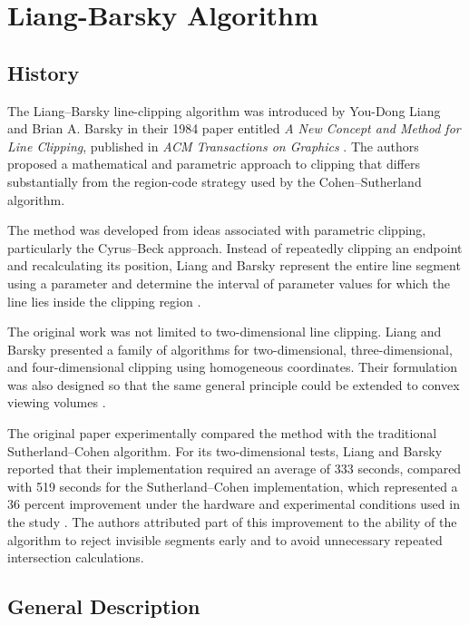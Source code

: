 
\section{Liang-Barsky Algorithm}

\subsection{History}

The Liang--Barsky line-clipping algorithm was introduced by You-Dong Liang and Brian A. Barsky in their 1984 paper entitled \textit{A New Concept and Method for Line Clipping}, published in \textit{ACM Transactions on Graphics} \cite{LiangBarsky1984}. The authors proposed a mathematical and parametric approach to clipping that differs substantially from the region-code strategy used by the Cohen--Sutherland algorithm.

The method was developed from ideas associated with parametric clipping, particularly the Cyrus--Beck approach. Instead of repeatedly clipping an endpoint and recalculating its position, Liang and Barsky represent the entire line segment using a parameter and determine the interval of parameter values for which the line lies inside the clipping region \cite{MatthesDrakopoulos2022}.

The original work was not limited to two-dimensional line clipping. Liang and Barsky presented a family of algorithms for two-dimensional, three-dimensional, and four-dimensional clipping using homogeneous coordinates. Their formulation was also designed so that the same general principle could be extended to convex viewing volumes \cite{LiangBarsky1984,GeneralizationLiangBarsky}.

The original paper experimentally compared the method with the traditional Sutherland--Cohen algorithm. For its two-dimensional tests, Liang and Barsky reported that their implementation required an average of 333 seconds, compared with 519 seconds for the Sutherland--Cohen implementation, which represented a 36 percent improvement under the hardware and experimental conditions used in the study \cite{LiangBarsky1984}. The authors attributed part of this improvement to the ability of the algorithm to reject invisible segments early and to avoid unnecessary repeated intersection calculations.

\subsection{General Description}

